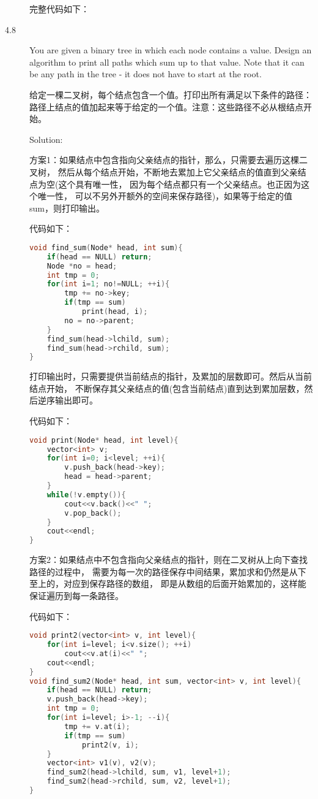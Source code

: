 \begin{description}
完整代码如下：



\item[4.8] You are given a binary tree in which each node contains a value. Design an algorithm to print all paths which sum up to that value. Note that it can be any path in the tree - it does not have to start at the root.

给定一棵二叉树，每个结点包含一个值。打印出所有满足以下条件的路径： 路径上结点的值加起来等于给定的一个值。注意：这些路径不必从根结点开始。

Solution: 

方案1：如果结点中包含指向父亲结点的指针，那么，只需要去遍历这棵二叉树， 然后从每个结点开始，不断地去累加上它父亲结点的值直到父亲结点为空(这个具有唯一性， 因为每个结点都只有一个父亲结点。也正因为这个唯一性， 可以不另外开额外的空间来保存路径)，如果等于给定的值sum，则打印输出。

代码如下：
\begin{lstlisting}[language=C++]
void find_sum(Node* head, int sum){
    if(head == NULL) return;
    Node *no = head;
    int tmp = 0;
    for(int i=1; no!=NULL; ++i){
        tmp += no->key;
        if(tmp == sum)
            print(head, i);
        no = no->parent;
    }
    find_sum(head->lchild, sum);
    find_sum(head->rchild, sum);
}
\end{lstlisting}

打印输出时，只需要提供当前结点的指针，及累加的层数即可。然后从当前结点开始， 不断保存其父亲结点的值(包含当前结点)直到达到累加层数，然后逆序输出即可。

代码如下：
\begin{lstlisting}[language=C++]
void print(Node* head, int level){
    vector<int> v;
    for(int i=0; i<level; ++i){
        v.push_back(head->key);
        head = head->parent;
    }
    while(!v.empty()){
        cout<<v.back()<<" ";
        v.pop_back();
    }
    cout<<endl;
}
\end{lstlisting}

方案2：如果结点中不包含指向父亲结点的指针，则在二叉树从上向下查找路径的过程中， 需要为每一次的路径保存中间结果，累加求和仍然是从下至上的，对应到保存路径的数组， 即是从数组的后面开始累加的，这样能保证遍历到每一条路径。

代码如下：
\begin{lstlisting}[language=C++]
void print2(vector<int> v, int level){
    for(int i=level; i<v.size(); ++i)
        cout<<v.at(i)<<" ";
    cout<<endl;
}
void find_sum2(Node* head, int sum, vector<int> v, int level){
    if(head == NULL) return;
    v.push_back(head->key);
    int tmp = 0;
    for(int i=level; i>-1; --i){
        tmp += v.at(i);
        if(tmp == sum)
            print2(v, i);
    }
    vector<int> v1(v), v2(v);
    find_sum2(head->lchild, sum, v1, level+1);
    find_sum2(head->rchild, sum, v2, level+1);
}
\end{lstlisting}


\end{description}
